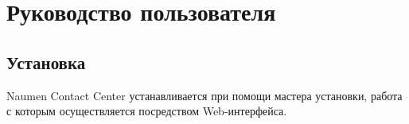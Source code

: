 \chapter{Руководство пользователя} %
\label{ch:usrmanual}

\section{Установка}


%
%
%

Naumen Contact Center устанавливается при помощи мастера установки, работа с которым осуществляется посредством Web-интерфейса.

